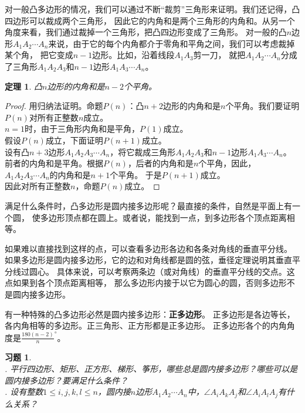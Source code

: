 \documentclass[12pt,UTF8]{ctexbook}
\newtheorem{tm}{定理}[section]
\newtheorem{xt}{习题}[section]
\begin{document}
对一般凸多边形的情况，我们可以通过不断“裁剪”三角形来证明。我们还记得，凸四边形可以裁成两个三角形，
因此它的内角和是两个三角形的内角和。从另一个角度来看，我们通过裁掉一个三角形，把凸四边形变成了三角形。
对一般的凸$n$边形$A_1A_2\cdots A_n$来说，由于它的每个内角都介于零角和平角之间，我们可以考虑裁掉某个角，
把它变成$n-1$边形。比如，沿着线段$A_1A_3$剪一刀，
就把$A_1A_2\cdots A_n$分成了三角形$A_1A_2A_3$和$n-1$边形$A_1A_3\cdots A_n$。

\begin{tm}\label{tm:1-4-0}
    凸$n$边形的内角和是$n-2$个平角。
\end{tm}
\begin{proof}
    用归纳法证明。命题$P(n)$：凸$n+2$边形的内角和是$n$个平角。我们要证明$P(n)$对所有正整数$n$成立。\\
    $n=1$时，由于三角形内角和是平角，$P(1)$成立。\\
    假设$P(n)$成立，下面证明$P(n+1)$成立。\\
    设有凸$n+3$边形$A_1A_2A_3\cdots A_n$，将它裁成三角形$A_1A_2A_3$和$n-1$边形$A_1A_3\cdots A_n$。
    前者的内角和是平角。根据$P(n)$，后者的内角和是$n$个平角，因此，$A_1A_2A_3\cdots A_n$的内角和是$n+1$个平角。
    于是$P(n+1)$成立。\\
    因此对所有正整数$n$，命题$P(n)$成立。
\end{proof}

满足什么条件时，凸多边形是圆内接多边形呢？最直接的条件，自然是平面上有一个圆，
使多边形顶点都在圆上。或者说，能找到一点，到多边形各个顶点距离相等。

如果难以直接找到这样的点，可以查看多边形各边和各条对角线的垂直平分线。
如果多边形是圆内接多边形，它的边和对角线都是圆的弦，垂径定理说明其垂直平分线过圆心。
具体来说，可以考察两条边（或对角线）的垂直平分线的交点。这点如果到各个顶点距离相等，
那么多边形内接于以它为圆心的圆，否则多边形不是圆内接多边形。

有一种特殊的凸多边形必然是圆内接多边形：\textbf{正多边形}。
正多边形是各边等长，各内角相等的多边形。正三角形、正方形都是正多边形。
正多边形各个的内角角度是$\frac{180(n-2)}{n}^\circ$。

\begin{xt}\label{xt:1-4-0}
    \mbox{}\\
    . 平行四边形、矩形、正方形、梯形、筝形，哪些总是圆内接多边形？哪些可以是圆内接多边形？要满足什么条件？\\
    . 设有整数$1 \leqslant i,j,k,l \leqslant n$，圆内接$n$边形$A_1A_2\cdots A_n$中，$\angle A_iA_kA_j$和$\angle A_iA_lA_j$有什么关系？
\end{xt}
\end{document}

